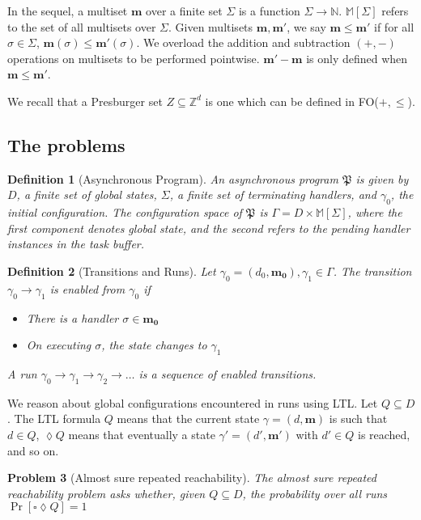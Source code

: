 \documentclass{article}
\newtheorem{definition}{Definition}[section]
\newtheorem{problem}[definition]{Problem}
\theoremstyle{remark}
\newcommand{\program}{\mathfrak{P}}
\newcommand{\multisets}{\mathbb{M}}
\newcommand{\naturals}{\mathbb{N}}
\begin{document}
In the sequel, a multiset $\mathbf{m}$ over a finite set $\Sigma$ is a function $\Sigma \rightarrow \naturals$. $\multisets[\Sigma]$ refers to the set of all multisets over $\Sigma$. Given multisets $\mathbf{m}, \mathbf{m'}$, we say $\mathbf{m} \le \mathbf{m'}$ if for all $\sigma \in \Sigma$, $\mathbf{m}(\sigma) \le \mathbf{m'}(\sigma)$. We overload the addition and subtraction $(+, -)$ operations on multisets to be performed pointwise. $\mathbf{m'} - \mathbf{m}$ is only defined when $\mathbf{m} \le \mathbf{m'}$.

We recall that a Presburger set $Z \subseteq \mathbb{Z}^d$ is one which can be defined in FO($+, \le$).

\subsection{The problems}
\begin{definition}[Asynchronous Program]
An asynchronous program $\program$ is given by $D$, a finite set of global states, $\Sigma$, a finite set of terminating handlers, and $\gamma_0$, the initial configuration. The configuration space of $\program$ is $\Gamma = D \times \multisets[\Sigma]$, where the first component denotes global state, and the second refers to the pending handler instances in the task buffer.
\end{definition}

\begin{definition}[Transitions and Runs]
Let $\gamma_0 = (d_0, \mathbf{m_0}), \gamma_1 \in \Gamma$. The transition $\gamma_0 \rightarrow \gamma_1$ is enabled from $\gamma_0$ if
\begin{itemize}
\item There is a handler $\sigma \in \mathbf{m_0}$
\item On executing $\sigma$, the state changes to $\gamma_1$
\end{itemize}
A run $\gamma_0 \rightarrow \gamma_1 \rightarrow \gamma_2 \rightarrow \dots$ is a sequence of enabled transitions.
\end{definition}

We reason about global configurations encountered in runs using LTL. Let $Q \subseteq D$. The LTL formula $Q$ means that the current state $\gamma = (d, \mathbf{m})$ is such that $d \in Q$, $\lozenge Q$ means that eventually a state $\gamma' = (d', \mathbf{m'})$ with $d' \in Q$ is reached, and so on.

\begin{problem}[Almost sure repeated reachability]
\label{almostsure}
The almost sure repeated reachability problem asks whether, given $Q \subseteq D$, the probability over all runs $\Pr[\square \lozenge Q] = 1$
\end{problem}
\end{document}
